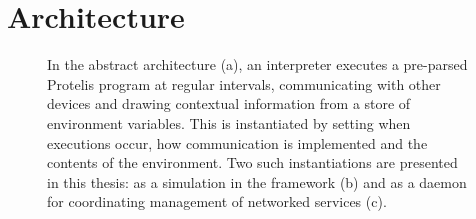 \documentclass[12pt,a4paper,twoside,openright]{book}
\begin{document}
\section{Architecture}
\label{protelis-architecture}
\begin{figure}
\centering
{}
\caption[Abstract \protelis{} architecture]{In the abstract \protelis{} architecture (a), an interpreter executes a pre-parsed Protelis program at regular intervals, communicating with other devices and drawing contextual information from a store of environment variables.
%
This is instantiated by setting when executions occur, how communication is implemented and the contents of the environment.
%
Two such instantiations are presented in this thesis: as a simulation in the \alchemist{} framework (b) and as a daemon for coordinating management of networked services (c).}
\label{img:protelis-architecture}
\end{figure}
\end{document}
